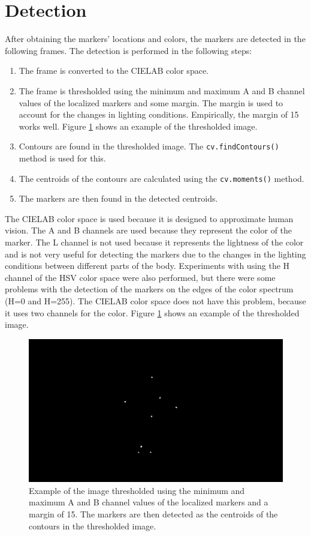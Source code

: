 \section{Detection}
\label{detection}
After obtaining the markers' locations and colors, the markers are detected in the following frames. The detection is performed in the following steps:
\begin{enumerate}
    \item The frame is converted to the CIELAB color space.
    \item The frame is thresholded using the minimum and maximum A and B channel values of the localized markers and some margin. The margin is used to account for the changes in lighting conditions. Empirically, the margin of 15 works well. Figure \ref{fig:marker_detection} shows an example of the thresholded image.
    \item Contours are found in the thresholded image. The \texttt{cv.findContours()} method is used for this.
    \item The centroids of the contours are calculated using the \texttt{cv.moments()} method.
    \item The markers are then found in the detected centroids.
\end{enumerate}

The CIELAB color space is used because it is designed to approximate human vision. The A and B channels are used because they represent the color of the marker. The L channel is not used because it represents the lightness of the color and is not very useful for detecting the markers due to the changes in the lighting conditions between different parts of the body. Experiments with using the H channel of the HSV color space were also performed, but there were some problems with the detection of the markers on the edges of the color spectrum (H=0 and H=255). The CIELAB color space does not have this problem, because it uses two channels for the color. Figure \ref{fig:marker_detection} shows an example of the thresholded image.

\begin{figure}[htb]
    \centering
    \includegraphics[width=\textwidth]{obrazky-figures/thresholded.png}
    \caption{Example of the image thresholded using the minimum and maximum A and B channel values of the localized markers and a margin of 15. The markers are then detected as the centroids of the contours in the thresholded image.}
    \label{fig:marker_detection}
\end{figure}

